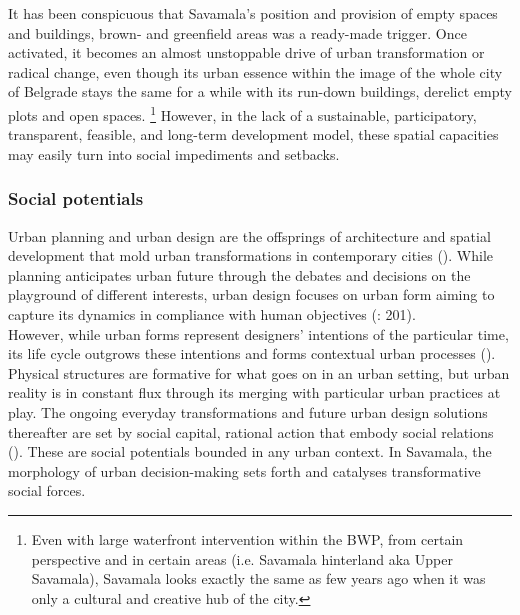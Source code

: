\documentclass[11pt]{report}
\begin{document}
It has been conspicuous that Savamala's position and provision of empty spaces and buildings, brown- and greenfield areas was a ready-made trigger.
Once activated, it becomes an almost unstoppable drive of urban transformation or radical change, even though its urban essence within the image of the whole city of Belgrade stays the same for a while with its run-down buildings, derelict empty plots and open spaces.
\footnote{Even with large waterfront intervention within the BWP, from certain perspective and in certain areas (i.e. Savamala hinterland aka Upper Savamala), Savamala looks exactly the same as few years ago when it was only a cultural and creative hub of the city.}
However, in the lack of a sustainable, participatory, transparent, feasible, and long-term development model, these spatial capacities may easily turn into social impediments and setbacks.

\subsubsection{Social potentials}

Urban planning and urban design are the offsprings of architecture and spatial development that mold urban transformations in contemporary cities (\citealt{rode_city_2006}).
While planning anticipates urban future through the debates and decisions on the playground of different interests, urban design focuses on urban form aiming to capture its dynamics in compliance with human objectives (\citealt{lynch_theory_1958}: 201).
\\

However, while urban forms represent designers' intentions of the particular time, its life cycle outgrows these intentions and forms contextual urban processes (\citealt{tonkiss_cities_2014}).
Physical structures are formative for what goes on in an urban setting, but urban reality is in constant flux through its merging with particular urban practices at play.
The ongoing everyday transformations and future urban design solutions thereafter are set by social capital, rational action that embody social relations (\citealt{coleman_social_1988}).
These are social potentials bounded in any urban context.
In Savamala, the morphology of urban decision-making sets forth and catalyses transformative social forces.
\\
\end{document}

